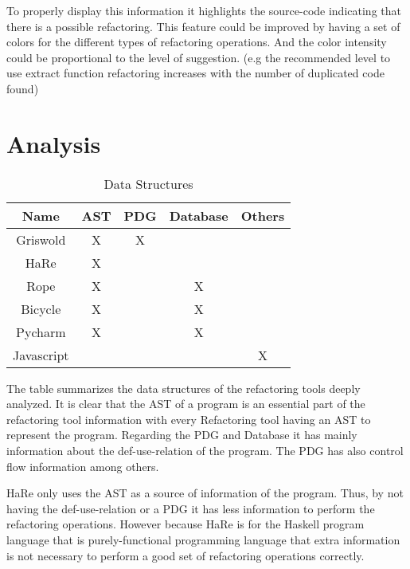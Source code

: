 To properly display this information it highlights the source-code indicating
that there is a possible refactoring.
This feature could be improved by having a set of colors for the different types
of refactoring operations. And the color intensity could be proportional to the level
of suggestion. (e.g the recommended level to use extract function refactoring
increases with the number of duplicated code found) %


\section{Analysis}
\begin{table}[]
\centering
\caption{Data Structures}
\label{my-label}
\begin{tabular}{c|c|c|c|c}
Name       & AST & PDG & Database & Others \\ \hline
Griswold   & X   & X   &          &        \\ \hline
HaRe       & X   &     &          &        \\ \hline
Rope       & X   &     & X        &        \\ \hline
Bicycle    & X   &     & X        &        \\ \hline
Pycharm    & X   &     & X        &        \\ \hline
Javascript &     &     &          & X
\end{tabular}
\end{table}

The table summarizes the data structures of the refactoring tools deeply analyzed.
It is clear that the AST of a program is an essential part of the refactoring
tool information with every Refactoring tool having an AST to represent the program.
Regarding the PDG and Database it has mainly information about the def-use-relation
of the program. The PDG has also control flow information among others.

HaRe only uses the AST as a source of information of the program. Thus, by not having
the def-use-relation or a PDG it has less information to perform the refactoring operations.
However because HaRe is for the Haskell program language that is purely-functional
programming language that extra information is not necessary to perform a good set of
refactoring operations correctly.



